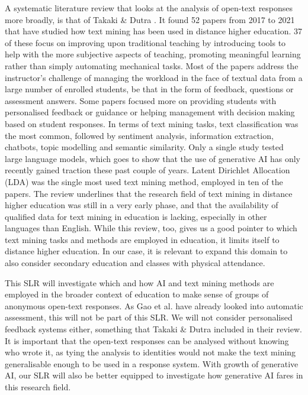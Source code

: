 A systematic literature review that looks at the analysis of open-text responses more broadly, is that of Takaki \& Dutra \cite{textmininglitrev}. It found 52 papers from 2017 to 2021 that have studied how text mining has been used in distance higher education. 37 of these focus on improving upon traditional teaching by introducing tools to help with the more subjective aspects of teaching, promoting meaningful learning rather than simply automating mechanical tasks. Most of the papers address the instructor's challenge of managing the workload in the face of textual data from a large number of enrolled students, be that in the form of feedback, questions or assessment answers. Some papers focused more on providing students with personalised feedback or guidance or helping management with decision making based on student responses. In terms of text mining tasks, text classification was the most common, followed by sentiment analysis, information extraction, chatbots, topic modelling and semantic similarity. Only a single study tested large language models, which goes to show that the use of generative AI has only recently gained traction these past couple of years. Latent Dirichlet Allocation (LDA) was the single most used text mining method, employed in ten of the papers. The review underlines that the research field of text mining in distance higher education was still in a very early phase, and that the availability of qualified data for text mining in education is lacking, especially in other languages than English. While this review, too, gives us a good pointer to which text mining tasks and methods are employed in education, it limits itself to distance higher education. In our case, it is relevant to expand this domain to also consider secondary education and classes with physical attendance.

This SLR will investigate which and how AI and text mining methods are employed in the broader context of education to make sense of groups of anonymous open-text responses. As Gao et al. \cite{autoassessmentlitrev} have already looked into automatic assessment, this will not be part of this SLR. We will not consider personalised feedback systems either, something that Takaki \& Dutra \cite{textmininglitrev} included in their review. It is important that the open-text responses can be analysed without knowing who wrote it, as tying the analysis to identities would not make the text mining generalisable enough to be used in a response system. With growth of generative AI, our SLR will also be better equipped to investigate how generative AI fares in this research field.

